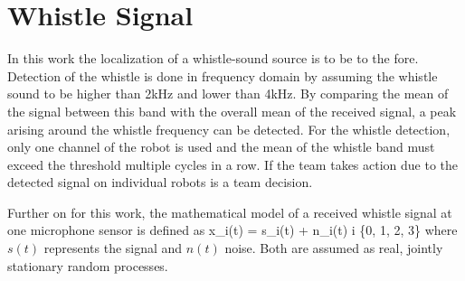\section{Whistle Signal}
\label{sec:02_whistleSignal}

In this work the localization of a whistle-sound source is to be to the fore.
Detection of the whistle is done in frequency domain by assuming the whistle
sound to be higher than 2\si{\kilo\hertz} and lower than 4\si{\kilo\hertz}.
By comparing the mean of the signal between this band with the overall mean of the
received signal, a peak arising around the whistle frequency can be detected.
For the whistle detection, only one channel of the robot is used and the
mean of the whistle band must exceed the threshold multiple cycles in a row.
If the team takes action due to the detected signal on individual robots is a team decision.

Further on for this work, the mathematical model of a received whistle
signal at one microphone sensor is defined as
\be
x_i(t) = s_i(t) + n_i(t)  i \in \{0, 1, 2, 3\}
\label{eq:02_whistleSignal}
\ee
where $s(t)$ represents the signal and $n(t)$ noise.
Both are assumed as real, jointly stationary random processes.